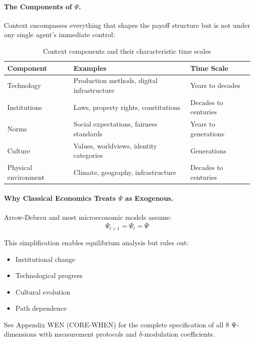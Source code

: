 
\paragraph{The Components of $\Psi$.}
Context encompasses everything that shapes the payoff structure
but is not under any single agent's immediate control:

\begin{table}[h]
\centering
\begin{tabular}{lll}
\toprule
\textbf{Component} & \textbf{Examples} & \textbf{Time Scale} \\
\midrule
Technology & Production methods, digital infrastructure & Years to decades \\
Institutions & Laws, property rights, constitutions & Decades to centuries \\
Norms & Social expectations, fairness standards & Years to generations \\
Culture & Values, worldviews, identity categories & Generations \\
Physical environment & Climate, geography, infrastructure & Decades to centuries \\
\bottomrule
\end{tabular}
\caption{Context components and their characteristic time scales}
\label{tab:context-components}
\end{table}

\paragraph{Why Classical Economics Treats $\Psi$ as Exogenous.}
Arrow-Debreu and most microeconomic models assume:
\begin{equation}
\Psi_{t+1} = \Psi_t = \bar{\Psi}
\label{eq:exogenous-assumption}
\end{equation}

This simplification enables equilibrium analysis but rules out:
\begin{itemize}[nosep]
  \item Institutional change
  \item Technological progress
  \item Cultural evolution
  \item Path dependence
\end{itemize}

\begin{cross-reference}
See Appendix WEN (CORE-WHEN) for the complete specification of all 8 Ψ-dimensions
with measurement protocols and $\delta$-modulation coefficients.
\end{cross-reference}


